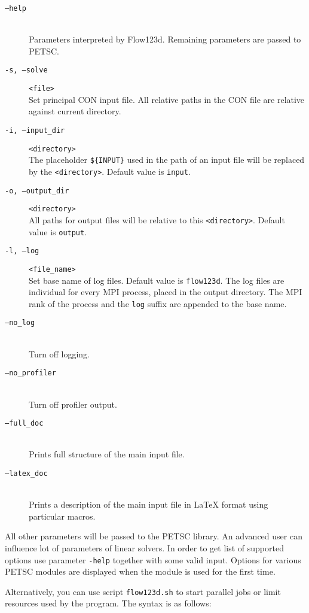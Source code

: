 \documentclass[12pt,a4paper]{report}
\begin{document}
\begin{description}
 \item[{\tt --help}] \hfill\\
        Parameters interpreted by Flow123d. Remaining parameters are passed to PETSC.
 \item[ {\tt -s, --solve} ] \verb'<file>' \hfill\\
 	 Set principal CON input file. All relative paths in the CON file are relative against current directory.
 \item[{\tt -i, --input\_dir}] \verb'<directory>' \hfill\\
 	The placeholder \verb"${INPUT}" %
  	used in the path of an input file will be replaced by the \verb'<directory>'. Default value is \verb'input'.
 \item[{\tt -o, --output\_dir}] \verb'<directory>' \hfill\\
 	All paths for output files will be relative to this \verb'<directory>'. Default value is \verb'output'.
 \item[{\tt -l, --log}] \verb'<file_name>' \hfill\\
 	Set base name of log files. Default value is \verb'flow123d'. The log files are individual for every MPI process, placed in the output directory. 
 	The MPI rank of the process and the \verb'log' suffix are appended to the base name.
 \item[{\tt --no\_log}] \hfill\\
        Turn off logging.
 \item[{\tt --no\_profiler}] \hfill\\
        Turn off profiler output.
 \item[{\tt --full\_doc}] \hfill\\
        Prints full structure of the main input file.
 \item[{\tt --latex\_doc}] \hfill\\ 
        Prints a description of the main input file in LaTeX format using particular macros.
\end{description}
All other parameters will be passed to the PETSC library. An advanced user can influence lot of parameters of linear solvers. In order to get list of supported options 
use parameter \verb'-help' together with some valid input. Options for various PETSC modules are displayed when the module is used for the first time.


Alternatively, you can use script \verb'flow123d.sh' to start parallel jobs or limit resources used by the program. 
The syntax is as follows:
\end{document}
